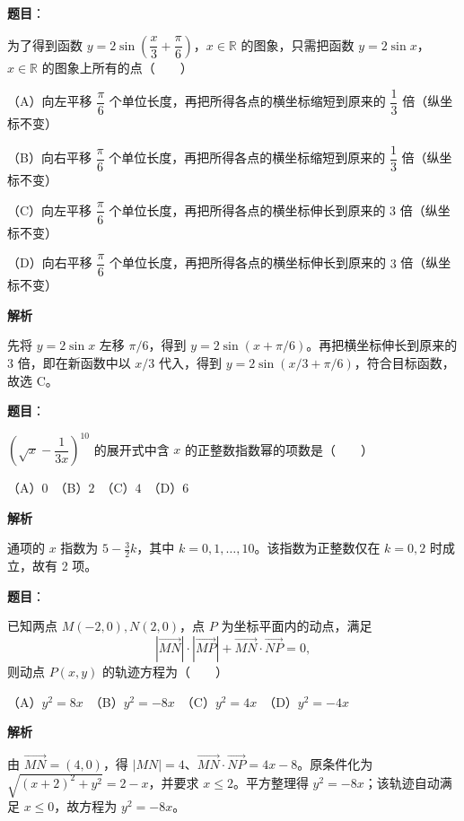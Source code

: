 \begin{answer}

\textbf{题目}：

为了得到函数 $y=2\sin\left(\dfrac{x}{3}+\dfrac{\pi}{6}\right)$，$x\in\mathbb R$ 的图象，只需把函数 $y=2\sin x$，$x\in\mathbb R$ 的图象上所有的点\mbox{（　　）}

（A）向左平移 $\dfrac{\pi}{6}$ 个单位长度，再把所得各点的横坐标缩短到原来的 $\dfrac13$ 倍（纵坐标不变）

（B）向右平移 $\dfrac{\pi}{6}$ 个单位长度，再把所得各点的横坐标缩短到原来的 $\dfrac13$ 倍（纵坐标不变）

（C）向左平移 $\dfrac{\pi}{6}$ 个单位长度，再把所得各点的横坐标伸长到原来的 $3$ 倍（纵坐标不变）

（D）向右平移 $\dfrac{\pi}{6}$ 个单位长度，再把所得各点的横坐标伸长到原来的 $3$ 倍（纵坐标不变）

\textbf{解析}

先将 $y=2\sin x$ 左移 $\pi/6$，得到 $y=2\sin(x+\pi/6)$。再把横坐标伸长到原来的 $3$ 倍，即在新函数中以 $x/3$ 代入，得到 $y=2\sin(x/3+\pi/6)$，符合目标函数，故选 C。


\end{answer}
\begin{answer}

\textbf{题目}：

$\left(\sqrt{x}-\dfrac{1}{3x}\right)^{10}$ 的展开式中含 $x$ 的正整数指数幂的项数是\mbox{（　　）}

（A）$0$　（B）$2$　（C）$4$　（D）$6$

\textbf{解析}

通项的 $x$ 指数为 $5-\frac32k$，其中 $k=0,1,\ldots,10$。该指数为正整数仅在 $k=0,2$ 时成立，故有 2 项。


\end{answer}
\begin{answer}

\textbf{题目}：

已知两点 $M(-2,0),N(2,0)$，点 $P$ 为坐标平面内的动点，满足
\nopagebreak[4]
\[\left|\overrightarrow{MN}\right|\cdot\left|\overrightarrow{MP}\right|+\overrightarrow{MN}\cdot\overrightarrow{NP}=0,\]
则动点 $P(x,y)$ 的轨迹方程为\mbox{（　　）}

（A）$y^2=8x$　（B）$y^2=-8x$　（C）$y^2=4x$　（D）$y^2=-4x$

\textbf{解析}

由 $\overrightarrow{MN}=(4,0)$，得 $|MN|=4$、$\overrightarrow{MN}\cdot\overrightarrow{NP}=4x-8$。原条件化为 $\sqrt{(x+2)^2+y^2}=2-x$，并要求 $x\le2$。平方整理得 $y^2=-8x$；该轨迹自动满足 $x\le0$，故方程为 $y^2=-8x$。


\end{answer}
